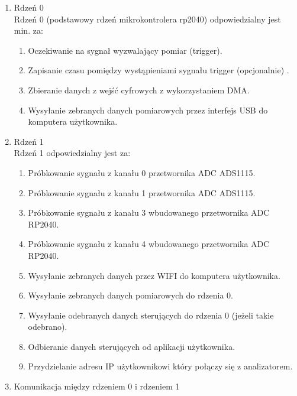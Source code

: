 \begin{enumerate}
    \item Rdzeń 0\\
    Rdzeń 0 (podstawowy rdzeń mikrokontrolera rp2040) odpowiedzialny jest min. za:
    \begin{enumerate}[label=\arabic*.]
        \item Oczekiwanie na sygnał wyzwalający pomiar (trigger).
        \item Zapisanie czasu pomiędzy wystąpieniami sygnału trigger (opcjonalnie) .
        \item Zbieranie danych z wejść cyfrowych z wykorzystaniem DMA.
        \item Wysyłanie zebranych danych pomiarowych przez interfejs USB do komputera użytkownika.
    \end{enumerate}

    \item Rdzeń 1\\
    Rdzeń 1 odpowiedzialny jest za:
    \begin{enumerate}[label=\arabic*.]
        \item Próbkowanie sygnału z kanału 0 przetwornika ADC ADS1115.
        \item Próbkowanie sygnału z kanału 1 przetwornika ADC ADS1115.
        \item Próbkowanie sygnału z kanału 3 wbudowanego przetwornika ADC RP2040.
        \item Próbkowanie sygnału z kanału 4 wbudowanego przetwornika ADC RP2040.
        \item Wysyłanie zebranych danych przez WIFI do komputera użytkownika.
        \item Wysyłanie zebranych danych pomiarowych do rdzenia 0.
        \item Wysyłanie odebranych danych sterujących do rdzenia 0 (jeżeli takie odebrano).
        \item Odbieranie danych sterujących od aplikacji użytkownika.
        \item Przydzielanie adresu IP użytkownikowi który połączy się z analizatorem.
    \end{enumerate}

    \newpage
    \item Komunikacja między rdzeniem 0 i rdzeniem 1
    \begin{figure}[H]
    \centering
    \begin{tikzpicture}[
        corebox/.style={
            rectangle,
            draw=blue!55,
            line width=1mm,
            fill=blue!20,
            rounded corners,
            minimum width=7cm,
            minimum height=10cm,
            align=left,
            text width=6cm,
            font=\bfseries
        },
        arrow/.style={
            <->,
            ultra thick,
            draw=blue!70
        }
    ]


\end{tikzpicture}
\end{figure}
\end{enumerate}
